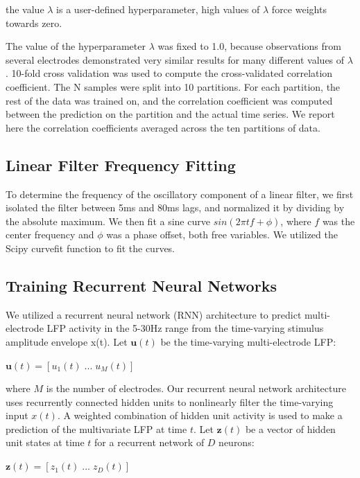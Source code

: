 the value $\lambda$ is a user-defined hyperparameter, high values of $\lambda$ force weights towards zero. 

The value of the hyperparameter $\lambda$ was fixed to 1.0, because observations from several electrodes demonstrated very similar results for many different values of $\lambda$. 10-fold cross validation was used to compute the cross-validated correlation coefficient. The N samples were split into 10 partitions. For each partition, the rest of the data was trained on, and the correlation coefficient was computed between the prediction on the partition and the actual time series. We report here the correlation coefficients averaged across the ten partitions of data.

\subsection{Linear Filter Frequency Fitting}

To determine the frequency of the oscillatory component of a linear filter, we first isolated the filter between 5ms and 80ms lags, and normalized it by dividing by the absolute maximum. We then fit a sine curve $sin(2\pi t f + \phi)$, where $f$ was the center frequency and $\phi$ was a phase offset, both free variables. We utilized the Scipy curvefit function to fit the curves.

\subsection{Training Recurrent Neural Networks}

We utilized a recurrent neural network (RNN) architecture to predict multi-electrode LFP activity in the 5-30Hz range from the time-varying stimulus amplitude envelope x(t). Let $\textbf{u}(t)$ be the time-varying multi-electrode LFP:

\begin{center}
$\textbf{u}(t) = [u_1 (t) \; ... \; u_M (t)]$
\end{center}

where $M$ is the number of electrodes. Our recurrent neural network architecture uses recurrently connected hidden units to nonlinearly filter the time-varying input $x(t)$. A weighted combination of hidden unit activity is used to make a prediction of the multivariate LFP at time $t$. Let $\textbf{z}(t)$ be a vector of hidden unit states at time $t$ for a recurrent network of $D$ neurons:

\begin{center}
$\textbf{z}(t) = [z_1 (t) \; ... \; z_D (t)]$
\end{center}

